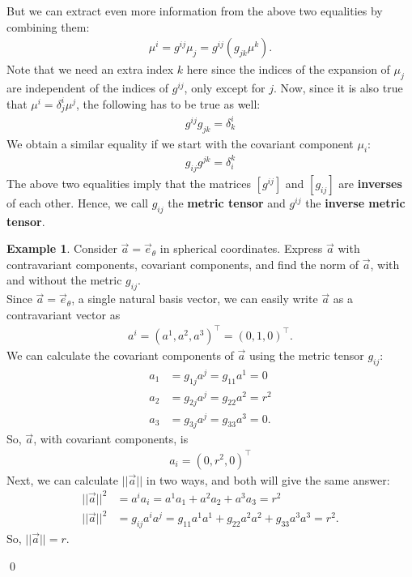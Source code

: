 \documentclass{book}
\theoremstyle{definition}
\newtheorem{exmp}{Example}[section]
\begin{document}
But we can extract even more information from the above two equalities by combining them:
\begin{align*}
\mu^i = g^{ij}\mu_j = g^{ij}\left(g_{jk}\mu^k\right). 
\end{align*}
Note that we need an extra index $k$ here since the indices of the expansion of $\mu_j$ are independent of the indices of $g^{ij}$, only except for $j$. Now, since it is also true that $\mu^i = \delta^i_j\mu^j$, the following has to be true as well:
\begin{align*}
\boxed{g^{ij}g_{jk} = \delta^i_k}
\end{align*}
We obtain a similar equality if we start with the covariant component $\mu_i$:
\begin{align*}
\boxed{g_{ij}g^{jk} = \delta^k_i}
\end{align*}
The above two equalities imply that the matrices $[g^{ij}]$ and $[g_{ij}]$ are \textbf{inverses} of each other. Hence, we call $g_{ij}$ the \textbf{metric tensor} and $g^{ij}$ the \textbf{inverse metric tensor}. 
\begin{exmp}
Consider $\vec{a} = \vec{e}_\theta$ in spherical coordinates. Express $\vec{a}$ with contravariant components, covariant components, and find the norm of $\vec{a}$, with and without the metric $g_{ij}$.\\

Since $\vec{a} = \vec{e}_\theta$, a single natural basis vector, we can easily write $\vec{a}$ as a contravariant vector as 
\begin{align*}
a^i = (a^1, a^2, a^3)^\top = (0,1,0)^\top. 
\end{align*}
We can calculate the covariant components of $\vec{a}$ using the metric tensor $g_{ij}$:
\begin{align*}
a_1 &= g_{1j}a^j = g_{11}a^1 = 0\\
a_2 &= g_{2j}a^j = g_{22}a^2 = r^2\\
a_3 &= g_{3j}a^j = g_{33}a^3 = 0.
\end{align*}
So, $\vec{a}$, with covariant components, is
\begin{align*}
a_i = (0, r^2, 0)^\top
\end{align*}
Next, we can calculate $\vert\vert \vec{a} \vert\vert$ in two ways, and both will give the same answer:
\begin{align*}
\vert\vert \vec{a} \vert\vert^2 &= a^ia_i = a^1a_1 + a^2a_2+a^3a_3 = r^2\\
\vert\vert \vec{a} \vert\vert^2 &= g_{ij}a^ia^j = g_{11}a^1a^1 +g_{22}a^2a^2 + g_{33}a^3a^3 = r^2.
\end{align*}
So, $\vert\vert \vec{a} \vert\vert  = r$.

\end{exmp}\qed
\end{document}
